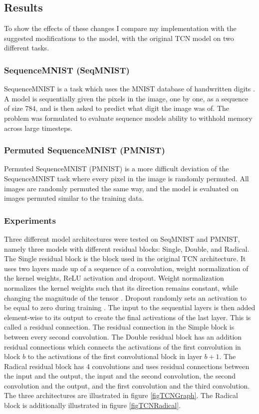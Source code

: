 \documentclass[a4paper, twoside]{article}
\begin{document}
\subsection{Results}
To show the effects of these changes I compare my implementation with the suggested modifications to the model, with the original TCN model \cite{tcn} on two different tasks.

\subsubsection{SequenceMNIST (SeqMNIST)}
SequenceMNIST is a task which uses the MNIST database of handwritten digits \cite{MNIST}. A model is sequentially given the pixels in the image, one by one, as a sequence of size $784$, and is then asked to predict what digit the image was of. The problem was formulated to evaluate sequence models ability to withhold memory across large timesteps.

\subsubsection{Permuted SequenceMNIST (PMNIST)}
Permuted SequenceMNIST (PMNIST) is a more difficult deviation of the SequenceMNIST task where every pixel in the image is randomly permuted. All images are randomly permuted the same way, and the model is evaluated on images permuted similar to the training data.

\subsubsection{Experiments}
Three different model architectures were tested on SeqMNIST and PMNIST, namely three models with different residual blocks: Single, Double, and Radical. The Single residual block is the block used in the original TCN \cite{tcn} architecture. It uses two layers made up of a sequence of a convolution, weight normalization of the kernel weights, ReLU activation and dropout. Weight normalization normalizes the kernel weights such that its direction remains constant, while changing the magnitude of the tensor \cite{pytorch}. Dropout randomly sets an activation to be equal to zero during training \cite{cs231n}. The input to the sequential layers is then added element-wise to its output to create the final activations of the last layer. This is called a residual connection. The residual connection in the Simple block is between every second convolution. The Double residual block has an addition residual connections which connects the activations of the first convolution in block $b$ to the activations of the first convolutional block in layer $b+1$. The Radical residual block has 4 convolutions and uses residual connections between the input and the output, the input and the second convolution, the second convolution and the output, and the first convolution and the third convolution. The three architectures are illustrated in figure \ref{figTCNGraph}. The Radical block is additionally illustrated in figure \ref{figTCNRadical}.
\end{document}
